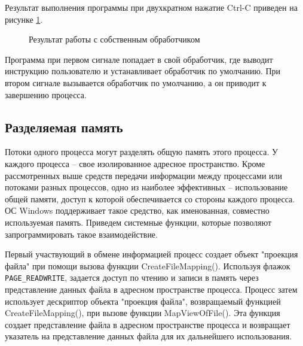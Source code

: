 \documentclass[a4paper]{article}
\begin{document}
	Результат выполнения программы при двухкратном нажатие Ctrl-C приведен на рисунке \ref{img:task7_1}.
	\begin{figure}[h!]
		\caption{Результат работы с собственным обработчиком}
		\label{img:task7_1}
	\end{figure}
	
	Программа при первом сигнале попадает в свой обработчик, где выводит инструкцию пользователю и устанавливает обработчик по умолчанию. При втором сигнале вызывается обработчик по умолчанию, а он приводит к завершению процесса.
	
\subsection{Разделяемая память}
	Потоки одного процесса могут разделять общую память этого процесса. У каждого процесса – свое изолированное адресное пространство. Кроме рассмотренных выше средств передачи информации между процессами или потоками разных процессов, одно из наиболее эффективных – использование общей памяти, доступ к которой обеспечивается со стороны каждого процесса. ОС Windows поддерживает такое средство, как именованная, совместно используемая память.
Приведем системные функции, которые позволяют запрограммировать такое взаимодействие.
	
	Первый участвующий в обмене информацией процесс создает объект "проекция файла" при помощи вызова функции CreateFileMapping(). Используя флажок \texttt{PAGE\_READWRITE}, задается доступ по чтению и записи в память через представление данных файла в адресном пространстве процесса. Процесс затем использует дескриптор объекта "проекция файла", возвращаемый функцией CreateFileMapping(), при вызове функции MapViewOfFile(). Эта функция создает представление файла в адресном пространстве процесса и возвращает указатель на представление данных файла для их дальнейшего использования.
	
\end{document}
